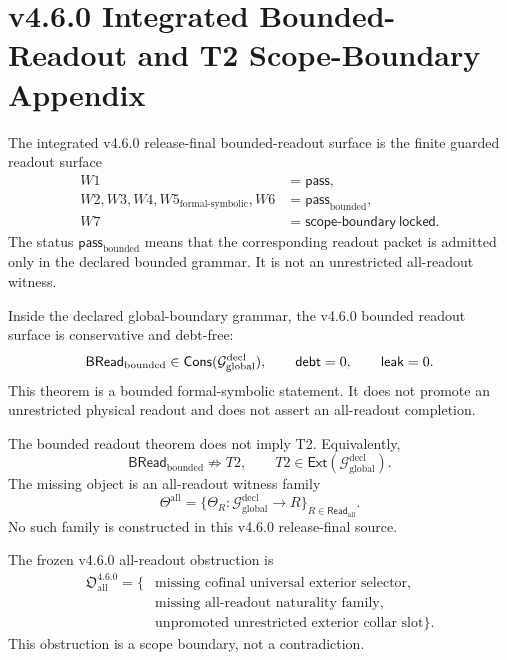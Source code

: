 \section*{v4.6.0 Integrated Bounded-Readout and T2 Scope-Boundary Appendix}

\begin{definition}
The integrated v4.6.0 release-final bounded-readout surface is the finite guarded readout
surface
\[
\begin{aligned}
 W1&=\mathsf{pass},\\
 W2,W3,W4,W5_{\mathrm{formal\text{-}symbolic}},W6
   &=\mathsf{pass}_{\mathrm{bounded}},\\
 W7&=\mathsf{scope\text{-}boundary\ locked}.
\end{aligned}
\]
The status \(\mathsf{pass}_{\mathrm{bounded}}\) means that the corresponding
readout packet is admitted only in the declared bounded grammar.  It is not an
unrestricted all-readout witness.
\end{definition}

\begin{theorem}
Inside the declared global-boundary grammar, the v4.6.0 bounded readout surface
is conservative and debt-free:
\[
 \mathsf{BRead}_{\mathrm{bounded}}
 \in
 \mathsf{Cons}(\mathcal G_{\mathrm{global}}^{\mathrm{decl}}),
 \qquad
 \mathsf{debt}=0,
 \qquad
 \mathsf{leak}=0.
\]
This theorem is a bounded formal-symbolic statement.  It does not promote an
unrestricted physical readout and does not assert an all-readout completion.
\end{theorem}

\begin{theorem}
The bounded readout theorem does not imply T2.  Equivalently,
\[
 \mathsf{BRead}_{\mathrm{bounded}}\not\Rightarrow T2,
 \qquad
 T2\in\mathsf{Ext}(\mathcal G_{\mathrm{global}}^{\mathrm{decl}}).
\]
The missing object is an all-readout witness family
\[
 \Theta^{\mathrm{all}}
 =
 \{\Theta_R:\mathcal G_{\mathrm{global}}^{\mathrm{decl}}\to R\}_{R\in\mathsf{Read}_{\mathrm{all}}}.
\]
No such family is constructed in this v4.6.0 release-final source.
\end{theorem}

\begin{definition}
The frozen v4.6.0 all-readout obstruction is
\[
\begin{aligned}
\mathfrak O_{\mathrm{all}}^{4.6.0}=\{&
\text{missing cofinal universal exterior selector},\\
&\text{missing all-readout naturality family},\\
&\text{unpromoted unrestricted exterior collar slot}\}.
\end{aligned}
\]
This obstruction is a scope boundary, not a contradiction.
\end{definition}


